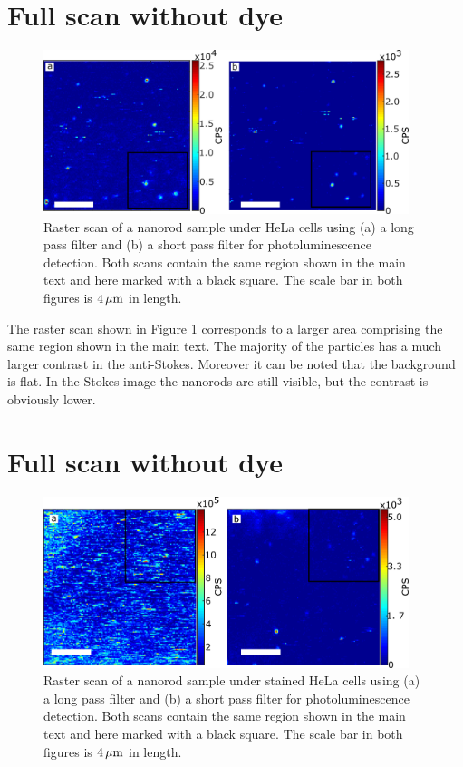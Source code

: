 \section{Full scan without dye}
\begin{figure}[htp] \centering
\includegraphics[width=0.95\textwidth]{Chapters/03_Background_Free/Figures/Supplementary/06_Full_scans/full_no_dye.png}
\caption{Raster scan of a nanorod sample under HeLa cells using (a) a long pass
filter and (b) a short pass filter for photoluminescence detection. Both scans
contain the same region shown in the main text and here marked with a black
square. The scale bar in both figures is $4\,\mu\textrm{m}$ in length.}
	\label{fig:full_no_dye}
\end{figure}

The raster scan shown in Figure \ref{fig:full_no_dye} corresponds to a larger
area comprising the same region shown in the main text. The majority of the
particles has a much larger contrast in the anti-Stokes. Moreover it can be
noted that the background is flat. In the Stokes image the nanorods are still
visible, but the contrast is obviously lower.

\section{Full scan without dye}
\begin{figure}[htp] \centering
\includegraphics[width=0.95\textwidth]{Chapters/03_Background_Free/Figures/Supplementary/07_Full_scans_dye/full_with_dye.png}
\caption{Raster scan of a nanorod sample under stained HeLa cells using (a) a
long pass filter and (b) a short pass filter for photoluminescence detection. Both scans
contain the same region shown in the main text and here marked with a black
square. The scale bar in both figures is $4\,\mu\textrm{m}$ in length.}
	\label{fig:full_with_dye}
\end{figure}

